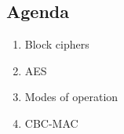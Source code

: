 

\subsection*{Agenda}
\begin{enumerate}
\item Block ciphers
\item AES
\item Modes of operation
\item CBC-MAC
\end{enumerate}
